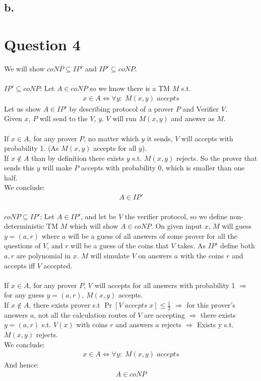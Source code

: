 \documentclass[11pt]{article}
\theoremstyle{plain}
\theoremstyle{nonumberplainnobrackets}
\begin{document}
\subsection*{b.}

\section*{Question 4}
We will show  $coNP\subseteq IP'$ and $IP'\subseteq coNP$.\\ \\
\underline{$IP'\subseteq coNP$}: Let $A\in coNP$ so we know there is a TM $M$ s.t.
\begin{align*}
x\in A \iff \forall y :\;M(x,y)\; accepts
\end{align*}
Let us show $A\in IP'$ by describing protocol of a prover $P$ and Verifier $V$. \\
Given $x$, $P$ will send to the $V$, $y$. $V$ will run $M(x,y)$ and answer as $M$.\\
\\
If $x\in A$, for any prover $P$, no matter which $y$ it sends, $V$ will accepts with probability 1. (As $M(x,y)$ accepts for all $y$). \\
If $x\notin A$ than by definition there exists $y$ s.t. $M(x,y)$ rejects. So the prover that sends this $y$ will make $P$ accepts with probability 0, which is smaller than one half.  \\
We conclude:
\begin{align*}
A\in IP'
\end{align*}
\\
\underline{$coNP\subseteq IP'$}: Let $A\in IP'$, and let be $V$ the verifier protocol, so we define non-deterministic TM $M$ which will show $A\in coNP$. On given input $x$, $M$ will guess $y=(a,r)$ where $a$ will be a guess of all answers of some prover for all the questions of $V$, and $r$ will be a guess of the coins that $V$ takes. As $IP'$ define both $a,r$ are polynomial in $x$. $M$ will simulate $V$ on answers $a$ with the coins $r$ and accepts iff $V$ accepted.
\\
\\
If $x\in A$, for any prover $P$, $V$ will accepts for all answers with probability 1 $\Rightarrow$ for any guess $y=(a,r)$, $M(x,y)$ accepts.\\
If $x\notin A$, there exists prover s.t $\Pr[V\;accepts \;x]\le \frac{1}{2}$ $\Rightarrow$ for this prover's answers $a$, not all the calculation routes of $V$ are accepting $\Rightarrow$ there exists $y=(a,r)$ s.t. $V(x)$ with coins $r$ and answers $a$ rejects $\Rightarrow$ Exists y s.t. $M(x,y)$ rejects.\\
We conclude:
\begin{align*}
x\in A\iff \forall y:\; M(x,y) \; accepts
\end{align*}
And hence:
\begin{align*}
A\in coNP
\end{align*}
\end{document}
